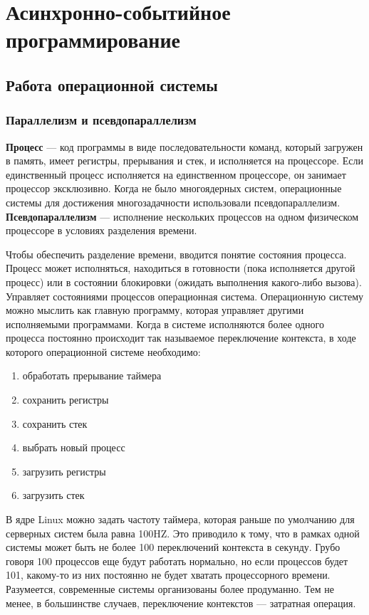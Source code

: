 \setcounter{chapter}{8}
\chapter{Асинхронно-событийное программирование}
\section{Работа операционной системы}
\subsection{Параллелизм и псевдопараллелизм}%

\textbf{Процесс} --- код программы в виде последовательности команд, который загружен в память, имеет регистры, прерывания и стек, и исполняется на процессоре. Если единственный процесс исполняется на единственном процессоре, он занимает процессор эксклюзивно. Когда не было многоядерных систем, операционные системы для достижения многозадачности использовали псевдопараллелизм. \textbf{Псевдопараллелизм} --- исполнение нескольких процессов на одном физическом процессоре в условиях разделения времени.

Чтобы обеспечить разделение времени, вводится понятие состояния процесса.
Процесс может исполняться, находиться в готовности (пока исполняется другой процесс) или в состоянии блокировки (ожидать выполнения какого-либо вызова). Управляет состояниями процессов операционная система. Операционную систему можно мыслить как главную программу, которая управляет другими исполняемыми программами. Когда в системе исполняются более одного процесса постоянно происходит так называемое переключение контекста, в ходе которого операционной системе необходимо:
\begin{enumerate}[nosep]
  \item обработать прерывание таймера
  \item сохранить регистры
  \item сохранить стек
  \item выбрать новый процесс
  \item загрузить регистры
  \item загрузить стек
\end{enumerate}
В ядре Linux можно задать частоту таймера, которая раньше по умолчанию для серверных систем была равна 100HZ. Это приводило к тому, что в рамках одной системы может быть не более 100 переключений контекста в секунду. Грубо говоря 100 процессов еще будут работать нормально, но если процессов будет 101, какому-то из них постоянно не будет хватать процессорного времени. Разумеется, современные системы организованы более продуманно. Тем не менее, в большинстве случаев, переключение контекстов --- затратная операция.

